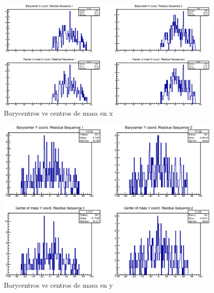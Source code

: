 \begin{figure}[htbp]
    \centering
    \includegraphics[width=1\linewidth]{./Figures/can1.eps}
    \caption[Barycentros vs centros de masa en x]{Barycentros vs centros de masa en x} %
    \label{fig:canx}
\end{figure}

\begin{figure}[htbp]
    \centering
    \includegraphics[width=1\linewidth]{./Figures/can2.eps}
    \caption[Barycentros vs centros de masa en y]{Barycentros vs centros de masa en y}
    \label{fig:cany}
\end{figure}

